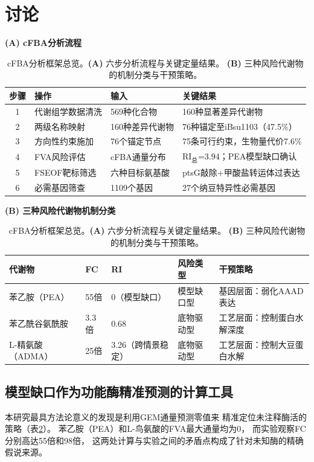 \documentclass[10pt, a4paper, twocolumn]{ctexart}
\newcommand{\ibsu}{iBsu1103}
\begin{document}
\section{讨论}

\begin{table}[t]
\caption{cFBA分析框架总览。\textbf{(A)} 六步分析流程与关键定量结果。
  \textbf{(B)} 三种风险代谢物的机制分类与干预策略。}
\label{tab:framework}
\small\centering
\textbf{(A) cFBA分析流程}\\[4pt]
\begin{tabular}{clll}
\toprule
\textbf{步骤} & \textbf{操作} & \textbf{输入} & \textbf{关键结果} \\
\midrule
1 & 代谢组学数据清洗 & 569种化合物 & 160种显著差异代谢物 \\
2 & 两级名称映射 & 160种差异代谢物 & 76种锚定至\ibsu{}（47.5\%） \\
3 & 方向性约束施加 & 76个锚定节点 & 75条可行约束，生物量代价7.6\% \\
4 & FVA风险评估 & cFBA通量分布 & RI$_\text{总}$=3.94；PEA模型缺口确认 \\
5 & FSEOF靶标筛选 & 六种目标氨基酸 & ptsG敲除+甲酸盐转运体过表达 \\
6 & 必需基因筛查 & 1109个基因 & 27个纳豆特异性必需基因 \\
\bottomrule
\end{tabular}

\vspace{6pt}
\textbf{(B) 三种风险代谢物机制分类}\\[4pt]
\begin{tabular}{llllp{3.2cm}}
\toprule
\textbf{代谢物} & \textbf{FC} & \textbf{RI} & \textbf{风险类型} & \textbf{干预策略} \\
\midrule
苯乙胺（PEA）    & 55倍 & 0（模型缺口） & 模型缺口型 & 基因层面：弱化AAAD表达 \\
苯乙酰谷氨酰胺   &  3.3倍 & 0.68 & 底物驱动型 & 工艺层面：控制蛋白水解深度 \\
L-精氨酸（ADMA） & 25倍 & 3.26（跨情景稳定） & 底物驱动型 & 工艺层面：控制大豆蛋白水解 \\
\bottomrule
\end{tabular}
\end{table}

\subsection{模型缺口作为功能酶精准预测的计算工具}

本研究最具方法论意义的发现是利用GEM通量预测零值来
精准定位未注释酶活的策略（表\ref{tab:framework}）。
苯乙胺（PEA）和L-鸟氨酸的FVA最大通量均为0，
而实验观察FC分别高达55倍和98倍，
这两处计算与实验之间的矛盾点构成了针对未知酶的精确假说来源。
\end{document}
